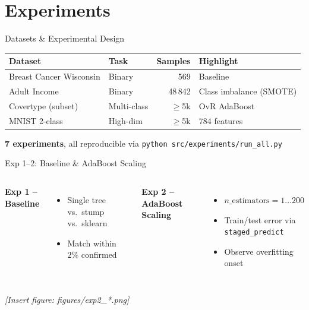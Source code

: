 \documentclass[aspectratio=169,12pt]{beamer}
\begin{document}
\section{Experiments}
\begin{frame}{Datasets \& Experimental Design}
\begin{table}
\centering
\begin{tabular}{llrl}
\toprule
Dataset & Task & Samples & Highlight \\
\midrule
Breast Cancer Wisconsin & Binary & 569 & Baseline \\
Adult Income & Binary & 48\,842 & Class imbalance (SMOTE) \\
Covertype (subset) & Multi-class & $\geq$5k & OvR AdaBoost \\
MNIST 2-class & High-dim & $\geq$5k & 784 features \\
\bottomrule
\end{tabular}
\end{table}
\vfill
\textbf{7 experiments}, all reproducible via \texttt{python src/experiments/run\_all.py}
\end{frame}

\begin{frame}{Exp 1--2: Baseline \& AdaBoost Scaling}
\begin{columns}
\textbf{Exp 1 -- Baseline}
\begin{itemize}
  \item Single tree vs.\ stump vs.\ sklearn
  \item Match within $2\%$ confirmed
\end{itemize}

\textbf{Exp 2 -- AdaBoost Scaling}
\begin{itemize}
  \item $n\_\text{estimators} = 1 \ldots 200$
  \item Train/test error via \texttt{staged\_predict}
  \item Observe overfitting onset
\end{itemize}
\end{columns}
\vfill
\textit{[Insert figure: figures/exp2\_*.png]}
\end{frame}
\end{document}
